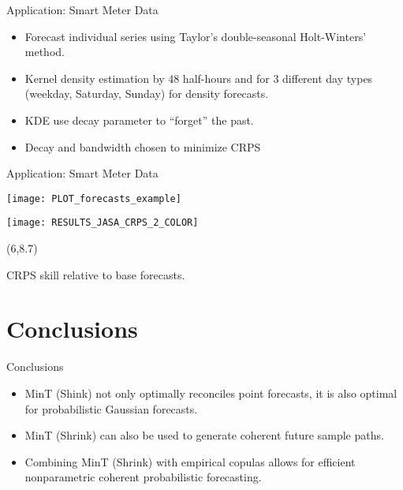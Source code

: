 \documentclass[14pt]{beamer}
\begin{document}
\begin{frame}{Application: Smart Meter Data}

\begin{itemize}
  \item Forecast individual series using Taylor's double-seasonal Holt-Winters' method.
  \item Kernel density estimation by 48 half-hours and for 3 different day types (weekday, Saturday, Sunday) for density forecasts.
  \item KDE use decay parameter to ``forget'' the past.
  \item Decay and bandwidth chosen to minimize CRPS
\end{itemize}
\end{frame}


\begin{frame}{Application: Smart Meter Data}
\centerline{\texttt{[image: PLOT\_forecasts\_example]}}
\centerline{\texttt{[image: RESULTS\_JASA\_CRPS\_2\_COLOR]}}
\begin{textblock}{6.6}(6,8.7)
\begin{block}{}\small CRPS skill relative to base forecasts.\end{block}
\end{textblock}
\end{frame}

\section{Conclusions}

\begin{frame}{Conclusions}

\begin{itemize}
  \item MinT (Shink) not only optimally reconciles point forecasts, it is also optimal for probabilistic Gaussian forecasts.
  \item MinT (Shrink) can also be used to generate coherent future sample paths.
  \item Combining MinT (Shrink) with empirical copulas allows for efficient nonparametric coherent probabilistic forecasting.
\end{itemize}

\end{frame}
\end{document}
